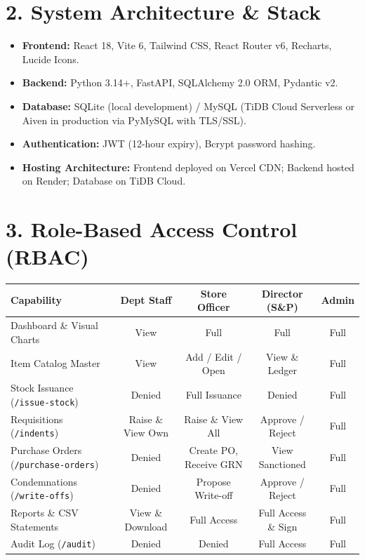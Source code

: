 \documentclass[11pt,a4paper]{article}
\begin{document}
\section{2. System Architecture \& Stack}
\begin{itemize}[noitemsep]
    \item \textbf{Frontend:} React 18, Vite 6, Tailwind CSS, React Router v6, Recharts, Lucide Icons.
    \item \textbf{Backend:} Python 3.14+, FastAPI, SQLAlchemy 2.0 ORM, Pydantic v2.
    \item \textbf{Database:} SQLite (local development) / MySQL (TiDB Cloud Serverless or Aiven in production via PyMySQL with TLS/SSL).
    \item \textbf{Authentication:} JWT (12-hour expiry), Bcrypt password hashing.
    \item \textbf{Hosting Architecture:} Frontend deployed on Vercel CDN; Backend hosted on Render; Database on TiDB Cloud.
\end{itemize}

\section{3. Role-Based Access Control (RBAC)}
\begin{table}[h]
\centering
\small
\begin{tabular}{@{}lcccc@{}}
\toprule
\textbf{Capability} & \textbf{Dept Staff} & \textbf{Store Officer} & \textbf{Director (S\&P)} & \textbf{Admin} \\ \midrule
Dashboard \& Visual Charts & View & Full & Full & Full \\
Item Catalog Master & View & Add / Edit / Open & View \& Ledger & Full \\
Stock Issuance (\texttt{/issue-stock}) & Denied & Full Issuance & Denied & Full \\
Requisitions (\texttt{/indents}) & Raise \& View Own & Raise \& View All & Approve / Reject & Full \\
Purchase Orders (\texttt{/purchase-orders}) & Denied & Create PO, Receive GRN & View Sanctioned & Full \\
Condemnations (\texttt{/write-offs}) & Denied & Propose Write-off & Approve / Reject & Full \\
Reports \& CSV Statements & View \& Download & Full Access & Full Access \& Sign & Full \\
Audit Log (\texttt{/audit}) & Denied & Denied & Full Access & Full \\ \bottomrule
\end{tabular}
\end{table}
\end{document}
